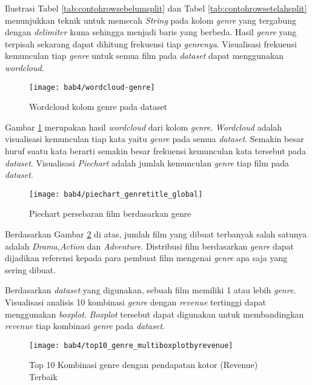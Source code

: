 Ilustrasi Tabel \ref{tab:contohrowsebelumsplit} dan Tabel \ref{tab:contohrowsetelahsplit} menunjukkan teknik untuk memecah \textit{String} pada kolom \textit{genre} yang tergabung dengan \textit{delimiter} koma sehingga menjadi baris yang berbeda. Hasil \textit{genre} yang terpisah sekarang dapat dihitung frekuensi tiap \textit{genrenya}. Visualisasi  frekuensi kemunculan tiap  \textit{genre} untuk semua film pada \textit{dataset} dapat menggunakan \textit{wordcloud}.

\begin{figure}[H]
	\centering  
	\texttt{[image: bab4/wordcloud-genre]}   
	\caption{Wordcloud kolom genre pada dataset}
	\label{fig:wordcloudgenre} 
\end{figure} 

Gambar \ref{fig:wordcloudgenre} merupakan hasil \textit{wordcloud} dari kolom \textit{genre}. \textit{Wordcloud} adalah visualisasi kemunculan tiap kata yaitu \textit{genre} pada semua \textit{dataset}. Semakin besar huruf suatu kata berarti semakin besar frekuensi kemunculan kata tersebut pada \textit{dataset}. Visualisasi \textit{Piechart} adalah jumlah kemunculan  \textit{genre} tiap film pada \textit{dataset}. 

\begin{figure}[H]
	\centering  
	\texttt{[image: bab4/piechart\_genretitle\_global]}   
	\caption{Piechart persebaran film berdasarkan genre}
	\label{fig:piechart_genretitle_global} 
\end{figure} 

Berdasarkan Gambar \ref{fig:piechart_genretitle_global} di atas, jumlah film yang dibuat terbanyak salah satunya adalah \textit{Drama,Action} dan \textit{Adventure}. Distribusi film berdasarkan \textit{genre} dapat  dijadikan referensi kepada para pembuat film mengenai \textit{genre} apa saja yang sering dibuat.


 Berdasarkan \textit{dataset} yang digunakan, sebuah film memiliki 1 atau lebih \textit{genre}. Visualisasi analisis 10 kombinasi \textit{genre} dengan \textit{revenue} tertinggi dapat menggunakan \textit{boxplot}. \textit{Boxplot} tersebut dapat digunakan untuk membandingkan \textit{revenue} tiap kombinasi \textit{genre} pada \textit{dataset}.


\begin{figure}[H]
	\centering  
	\texttt{[image: bab4/top10\_genre\_multiboxplotbyrevenue]}   
	\caption{Top 10 Kombinasi genre dengan pendapatan kotor (Revenue) Terbaik}
	\label{fig:top10_genre_multiboxplotbyrevenue} 
\end{figure} 

